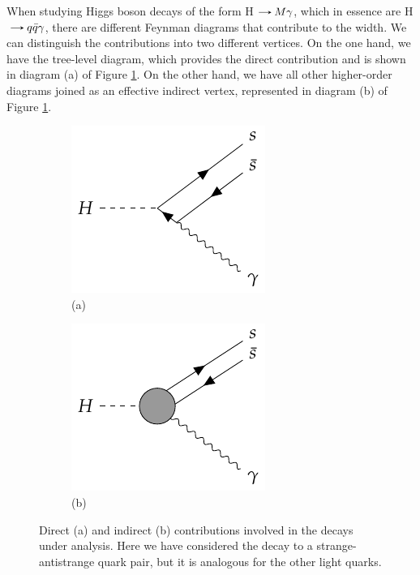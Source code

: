 When studying Higgs boson decays of the form H$\decaysto M\gamma$, which in essence are H$\decaysto q\bar{q}\gamma$, there are different Feynman diagrams that contribute to the width. We can distinguish the contributions into two different vertices. On the one hand, we have the tree-level diagram, which provides the direct contribution and is shown in diagram (a) of Figure \ref{fig:Higgs_rare_decay_veritces}. On the other hand, we have all other higher-order diagrams joined as an effective indirect vertex, represented in diagram (b) of Figure \ref{fig:Higgs_rare_decay_veritces}.

\begin{figure}[!ht]
    \captionsetup[subfigure]{labelformat=empty}
    \vspace*{-0.2cm}
    \centering
    \setlength{\mylength}{\textwidth}
    \begin{subfigure}[t]{0.5\mylength}
            \centering
            \includegraphics[height=0.26\mylength]{resources/H_rare_decays_vertices/v1.pdf}
            \setlength{\unitlength}{0.26\mylength}
            \caption{\footnotesize (a)}
    \end{subfigure}%
    \begin{subfigure}[t]{0.5\mylength}
            \centering
            \includegraphics[height=0.26\mylength]{resources/H_rare_decays_vertices/v2_2.pdf}
            \setlength{\unitlength}{0.26\mylength}
            \caption{\footnotesize (b)}
    \end{subfigure}%
    \vspace*{-0.0cm}
    \caption{Direct (a) and indirect (b) contributions involved in the decays under analysis. Here we have considered the decay to a strange-antistrange quark pair, but it is analogous for the other light quarks.}
    \label{fig:Higgs_rare_decay_veritces}
    \vspace*{-0.0cm}
\end{figure}

